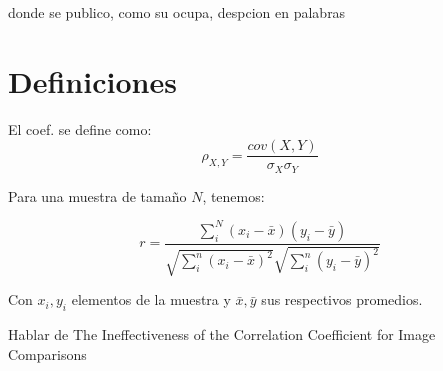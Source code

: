 		donde se publico, como su ocupa, despcion en palabras
	 
	\section{Definiciones}
	
	El coef. se define como:
	\begin{equation}\label{pearson_orig}
		\rho_{X,Y}=\frac{cov(X,Y)}{\sigma_X\sigma_Y}
	\end{equation}
	
	Para una muestra de tama\~no $N$, tenemos:
	
	\begin{equation}\label{pearson_r}
		r=\frac{\sum_{i}^N\left(x_{i}-\bar{x}\right)\left(y_{i}-\bar{y}\right)}{\sqrt{\sum_{i}^n\left(x_{i}-\bar{x}\right)^{2}} \sqrt{\sum_{i}^n\left(y_{i}-\bar{y}\right)^{2}}}
	\end{equation}
	
	Con $x_i,y_i$ elementos de la muestra y $\bar{x},\bar{y}$ sus respectivos promedios.
	
	Hablar de The Ineffectiveness of the Correlation Coefficient for Image Comparisons
	
	\newpage